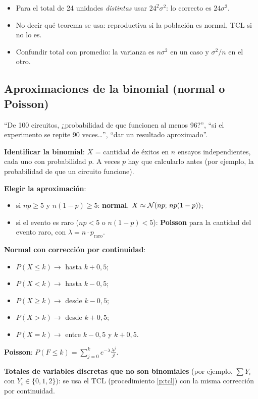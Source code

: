 \begin{ojo}
\begin{itemize}
\item Para el total de 24 unidades \emph{distintas} usar $24^2\sigma^2$: lo correcto es $24\sigma^2$.
\item No decir qué teorema se usa: reproductiva si la población es normal, TCL si no lo es.
\item Confundir total con promedio: la varianza es $n\sigma^2$ en un caso y $\sigma^2/n$ en el otro.
\end{itemize}
\end{ojo}

\subsection{Aproximaciones de la binomial (normal o Poisson)}\label{p:aprox}
\begin{cuando}
``De 100 circuitos, ¿probabilidad de que funcionen al menos 96?'', ``si el experimento se repite 90 veces\ldots'', ``dar un resultado aproximado''.
\end{cuando}
\begin{pasos}
\begin{pasolista}
\item \textbf{Identificar la binomial}: $X$ = cantidad de éxitos en $n$ ensayos independientes, cada uno con probabilidad $p$. A veces $p$ hay que calcularlo antes (por ejemplo, la probabilidad de que un circuito funcione).
\item \textbf{Elegir la aproximación}:
\begin{itemize}
\item si $np\ge5$ y $n(1-p)\ge5$: \textbf{normal}, $X\approx\mathcal{N}(np;\,np(1-p))$;
\item si el evento es raro ($np<5$ o $n(1-p)<5$): \textbf{Poisson} para la cantidad del evento raro, con $\lambda=n\cdot p_{\text{raro}}$.
\end{itemize}
\item \textbf{Normal con corrección por continuidad}:
\begin{itemize}
\item $P(X\le k)\to$ hasta $k+0{,}5$;
\item $P(X<k)\to$ hasta $k-0{,}5$;
\item $P(X\ge k)\to$ desde $k-0{,}5$;
\item $P(X>k)\to$ desde $k+0{,}5$;
\item $P(X=k)\to$ entre $k-0{,}5$ y $k+0{,}5$.
\end{itemize}
\item \textbf{Poisson}: $P(F\le k)=\sum_{j=0}^{k}e^{-\lambda}\frac{\lambda^j}{j!}$.
\item \textbf{Totales de variables discretas que no son binomiales} (por ejemplo, $\sum Y_i$ con $Y_i\in\{0,1,2\}$): se usa el TCL (procedimiento \ref{p:tcl}) con la misma corrección por continuidad.
\end{pasolista}
\end{pasos}
